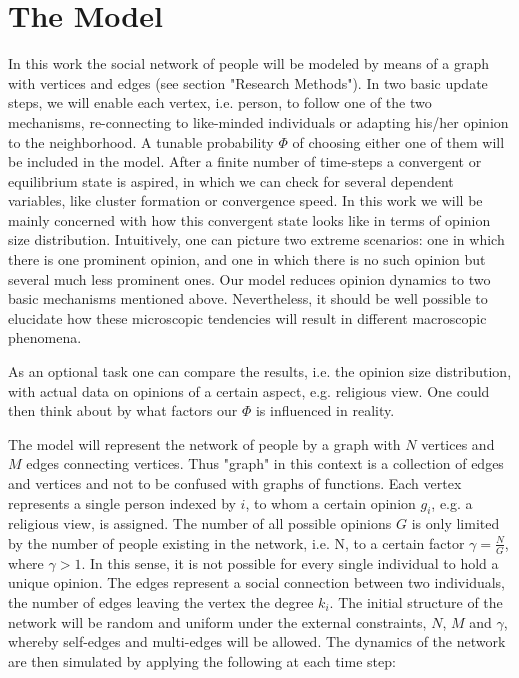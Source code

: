 \documentclass[11pt]{article}
\begin{document}
\section{The Model}

In this work the social network of people will be modeled by means of a graph with vertices and edges (see section "Research Methods"). In two basic update steps, we will enable each vertex, i.e. person, to follow one of the two mechanisms, re-connecting to like-minded individuals or adapting his/her opinion to the neighborhood. A tunable probability $\Phi$ of choosing either one of them will be included in the model. After a finite number of time-steps a convergent or equilibrium state is aspired, in which we can check for several dependent variables, like cluster formation or convergence speed. In this work we will be mainly concerned with how this convergent state looks like in terms of opinion size distribution. Intuitively, one can picture two extreme scenarios: one in which there is one prominent opinion, and one in which there is no such opinion but several much less prominent ones. Our model reduces opinion dynamics to two basic mechanisms mentioned above. Nevertheless, it should be well possible to elucidate how these microscopic tendencies will result in different macroscopic phenomena.

As an optional task one can compare the results, i.e. the opinion size distribution, with actual data on opinions of a certain aspect, e.g. religious view. One could then think about by what factors our $\Phi$ is influenced in reality.

The model will represent the network of people by a graph with $N$ vertices and $M$ edges connecting vertices. Thus "graph" in this context is a collection of edges and vertices and not to be confused with graphs of functions. Each vertex represents a single person indexed by $i$, to whom a certain opinion $g_i$, e.g. a religious view, is assigned. The number of all possible opinions $G$ is only limited by the number of people existing in the network, i.e. N, to a certain factor $\gamma = \frac{N}{G}$, where $\gamma > 1$. In this sense, it is not possible for every single individual to hold a unique opinion. The edges represent a social connection between two individuals, the number of edges leaving the vertex the degree $k_i$.
The initial structure of the network will be random and uniform under the external constraints, $N$, $M$ and $\gamma$, whereby self-edges and multi-edges will be allowed. The dynamics of the network are then simulated by applying the following at each time step:
\end{document}
